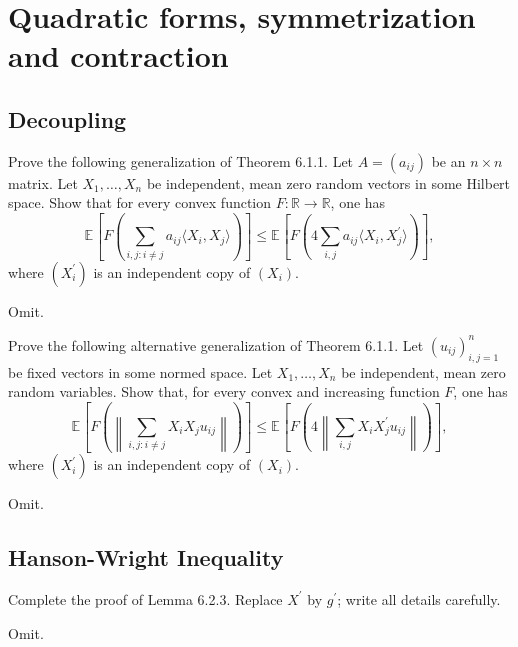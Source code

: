 \chapter{Quadratic forms, symmetrization and contraction}
\section{Decoupling}
\begin{problem*}[Exercise 6.1.4]\label{ex6.1.4}
	Prove the following generalization of Theorem 6.1.1. Let \(A = (a_{ij})\) be an \(n \times n\) matrix. Let \(X_1, \dots , X_n\) be independent, mean zero random vectors in some Hilbert space. Show that for every convex function \(F \colon \mathbb{R} \to \mathbb{R} \), one has
	\[
		\mathbb{E}_{}\left[F \left( \sum_{i, j\colon i \neq j} a_{ij} \langle X_i, X_j \rangle \right) \right]
		\leq \mathbb{E}_{}\left[F \left( 4 \sum_{i, j} a_{ij} \langle X_i, X_j^{\prime} \rangle  \right) \right] ,
	\]
	where \((X_i^{\prime} )\) is an independent copy of \((X_i)\).
\end{problem*}
\begin{answer}
	Omit.
\end{answer}

\begin{problem*}[Exercise 6.1.5]\label{ex6.1.5}
	Prove the following alternative generalization of Theorem 6.1.1. Let \((u_{ij})_{i, j = 1}^n\) be fixed vectors in some normed space. Let \(X_1, \dots , X_n\) be independent, mean zero random variables. Show that, for every convex and increasing function \(F\), one has
	\[
		\mathbb{E}_{}\left[F \left( \left\lVert \sum_{i, j \colon i \neq j} X_i X_j u_{ij} \right\rVert \right) \right]
		\leq \mathbb{E}_{}\left[F \left( 4 \left\lVert \sum_{i, j} X_i X_j^{\prime} u_{ij} \right\rVert  \right) \right] ,
	\]
	where \((X_i^{\prime} )\) is an independent copy of \((X_i)\).
\end{problem*}
\begin{answer}
	Omit.
\end{answer}

\section{Hanson-Wright Inequality}
\begin{problem*}[Exercise 6.2.4]\label{ex6.2.4}
	Complete the proof of Lemma 6.2.3. Replace \(X^{\prime} \) by \(g^{\prime} \); write all details carefully.
\end{problem*}
\begin{answer}
	Omit.
\end{answer}

